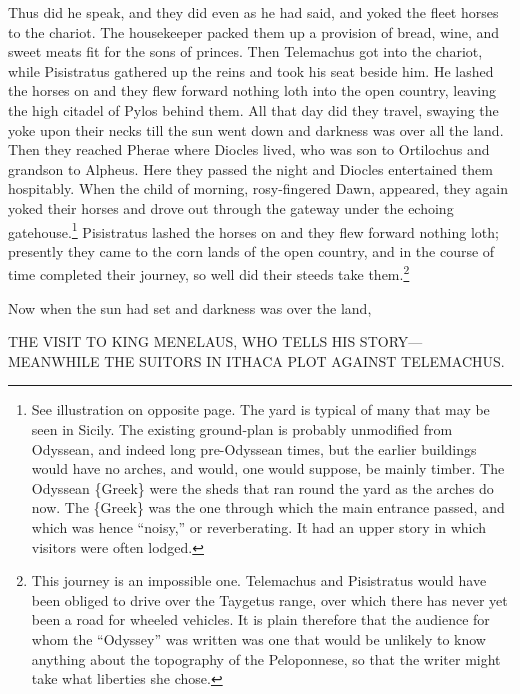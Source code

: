 Thus did he speak, and they did even as he had said, and yoked the fleet horses
to the chariot. The housekeeper packed them up a provision of bread, wine, and
sweet meats fit for the sons of princes. Then Telemachus got into the chariot,
while Pisistratus gathered up the reins and took his seat beside him. He lashed
the horses on and they flew forward nothing loth into the open country, leaving
the high citadel of Pylos behind them. All that day did they travel, swaying
the yoke upon their necks till the sun went down and darkness was over all the
land. Then they reached Pherae where Diocles lived, who was son to Ortilochus
and grandson to Alpheus. Here they passed the night and Diocles entertained
them hospitably. When the child of morning, rosy-fingered Dawn, appeared, they
again yoked their horses and drove out through the gateway under the echoing
gatehouse.\footnote{See illustration on opposite page. The yard is typical of many that may be
seen in Sicily. The existing ground-plan is probably unmodified from Odyssean,
and indeed long pre-Odyssean times, but the earlier buildings would have no
arches, and would, one would suppose, be mainly timber. The Odyssean \{Greek\}
were the sheds that ran round the yard as the arches do now. The \{Greek\} was
the one through which the main entrance passed, and which was hence “noisy,”
or reverberating. It had an upper story in which visitors were often lodged.}
Pisistratus lashed the horses on and they flew forward nothing loth; presently
they came to the corn lands of the open country, and in the course of time
completed their journey, so well did their steeds take them.\footnote{This journey is an impossible one. Telemachus and Pisistratus would have
been obliged to drive over the Taygetus range, over which there has never yet
been a road for wheeled vehicles. It is plain therefore that the audience for
whom the “Odyssey” was written was one that would be unlikely to know anything
about the topography of the Peloponnese, so that the writer might take what
liberties she chose.}

Now when the sun had set and darkness was over the land,


THE VISIT TO KING MENELAUS, WHO TELLS HIS STORY—MEANWHILE THE SUITORS IN ITHACA
PLOT AGAINST TELEMACHUS.

